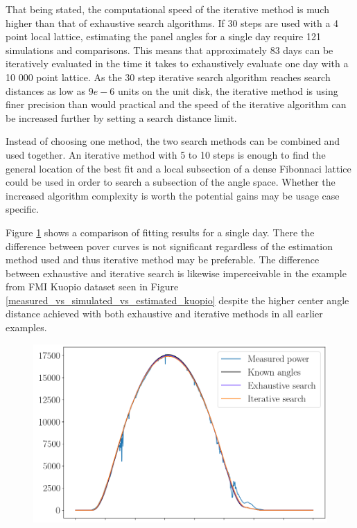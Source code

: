 That being stated, the computational speed of the iterative method is much higher than that of exhaustive search algorithms. If 30 steps are used with a 4 point local lattice, estimating the panel angles for a single day require 121 simulations and comparisons. This means that approximately 83 days can be iteratively evaluated in the time it takes to exhaustively evaluate one day with a 10 000 point lattice. As the 30 step iterative search algorithm reaches search distances as low as $9e-6$ units on the unit disk, the iterative method is using finer precision than would practical and the speed of the iterative algorithm can be increased further by setting a search distance limit.

Instead of choosing one method, the two search methods can be combined and used together. An iterative method with 5 to 10 steps is enough to find the general location of the best fit and a local subsection of a dense Fibonnaci lattice could be used in order to search a subsection of the angle space. Whether the increased algorithm complexity is worth the potential gains may be usage case specific.

Figure \ref{measured_vs_simulated_vs_estimated} shows a comparison of fitting results for a single day. There the difference between pover curves is not significant regardless of the estimation method used and thus iterative method may be preferable. The difference between exhaustive and iterative search is likewise imperceivable in the example from FMI Kuopio dataset seen in Figure \ref{measured_vs_simulated_vs_estimated_kuopio} despite the higher center angle distance achieved with both exhaustive and iterative methods in all earlier examples.


\begin{figure}[!h]
\centering
\includegraphics[width=0.8\linewidth]{pics/measured_vs_simulated_vs_estimated}
\label{measured_vs_simulated_vs_estimated}
\end{figure}

